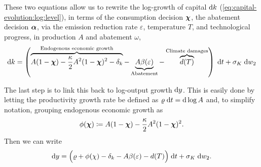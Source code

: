 \documentclass[../../main.tex]{subfiles}
\begin{document}
These two equations allow us to rewrite the log-growth of capital $\mathrm{d}k$ (\ref{eq:capital-evolution:log:level}), in terms of the consumption decision $\bm{\chi}$, the abatement decision $\bm{\alpha}$, via the emission reduction rate $\varepsilon$, temperature $T$, and technological progress, in production $A$ and abatement $\omega$, \begin{equation} \label{eq:capital-evolution:log:growth}
    \mathrm{d}k = \left( \overbrace{A (1 - \bm{\chi}) - \frac{\kappa}{2} A^2 (1 - \bm{\chi})^2 - \delta_k}^{\text{Endogenous economic growth}} - \underbrace{A \beta(\varepsilon)}_{\text{Abatement}} - \overbrace{d(T)}^{\text{Climate damages}} \right) \; \mathrm{d}t + \sigma_K \; \mathrm{d}w_2
\end{equation} 

The last step is to link this back to log-output growth $\mathrm{d}y$. This is easily done by letting the productivity growth rate be defined as $\varrho \; \mathrm{d}t = \mathrm{d}\log A$ and, to simplify notation, grouping endogenous economic growth as \begin{equation}
    \phi(\bm{\chi}) \coloneqq A (1 - \bm{\chi}) - \frac{\kappa}{2} A^2 (1 - \bm{\chi})^2.
\end{equation} Then we can write \begin{equation} \label{eq:output-evolution:log}
    \mathrm{d}y = \Big(\varrho + \phi(\chi) - \delta_k - A \beta(\varepsilon) - d(T) \Big) \; \mathrm{d}t + \sigma_K \; \mathrm{d}w_2.
\end{equation}
\end{document}
